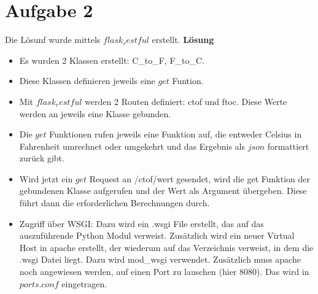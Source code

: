 \documentclass[12pt, a4paper]{report}
\begin{document}
\section*{Aufgabe 2}
Die Lösunf wurde mittels $flask_restful$ erstellt.
\textbf{Lösung}
\begin{itemize}
	\item Es wurden 2 Klassen erstellt: C\_to\_F, F\_to\_C.
	\item Diese Klassen definieren jeweils eine $get$ Funtion.
	\item Mit $flask_restful$ werden 2 Routen definiert: ctof und ftoc. Diese Werte
	werden an jeweils eine Klasse gebunden.
	\item Die $get$ Funktionen rufen jeweils eine Funktion auf, die entweder Celsius in Fahrenheit umrechnet oder umgekehrt und das Ergebnis als $json$ formattiert zurück
	gibt.
	\item Wird jetzt ein $get$ Request an /ctof/wert gesendet, wird die get Funktion der gebundenen Klasse aufgerufen und der Wert als Argument übergeben. Diese führt dann die erforderlichen Berechnungen durch.
	\item Zugriff über WSGI: Dazu wird ein .wsgi File erstellt, das auf das auszuführende Python Modul verweist. Zusätzlich wird ein neuer Virtual Host in apache erstellt, der wiederum auf das Verzeichnis verweist, in dem die .wsgi Datei liegt. Dazu wird mod\_wsgi verwendet. 
	Zusätzlich muss apache noch angewiesen werden, auf einen Port zu lauschen (hier 8080). Das wird in $ports.conf$ eingetragen.
	
\end{itemize}
\end{document}
